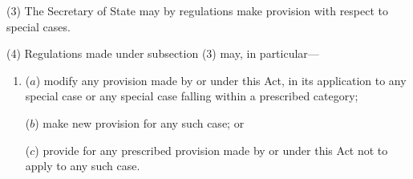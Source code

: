 \documentclass[12pt,a4paper]{article}
\begin{document}
(3)
The Secretary of State may by regulations make provision with respect to special cases.

(4) Regulations made under subsection (3) may, in particular---
\begin{enumerate}\item[]
($a$) modify any provision made by or under this Act, in its application to any
special case or any special case falling within a prescribed category;

($b$) make new provision for any such case; or

($c$) provide for any prescribed provision made by or under this Act not to
apply to any such case.
\end{enumerate}

\end{document}
